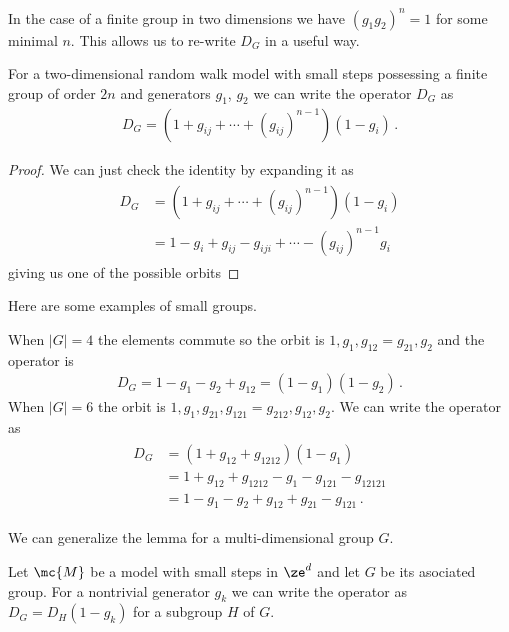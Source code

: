 In the case of a finite group in two dimensions we have $(g_1g_2)^n = 1$ for some minimal $n$. This allows us to re-write $D_G$ in a useful way.
\begin{lemma} For a two-dimensional random walk model with small steps possessing a finite group of order $2n$ and generators $g_1$, $g_2$ we can write the operator $D_G$ as
\begin{align}
	D_G = (1+g_{ij}+\cdots+(g_{ij})^{n-1})(1-g_i)\,.
\end{align}
\end{lemma}
\begin{proof} We can just check the identity by expanding it as
\begin{align}\begin{split}
	D_G &= (1+g_{ij}+\cdots+(g_{ij})^{n-1})(1-g_i)\\
	        &= 1- g_i +g_{ij}-g_{iji} + \cdots - (g_{ij})^{n-1}g_i
\end{split}\end{align}
giving us one of the possible orbits
\end{proof}
Here are some examples of small groups.
\begin{example} When $|G| = 4$ the elements commute so the orbit is $1, g_1,g_{12} = g_{21}, g_2$ and the operator is
\begin{align}
	D_G = 1 - g_1 - g_2 + g_{12} = (1-g_1)(1-g_2)\,.
\end{align}
When $|G| = 6$ the orbit is $1,g_1,g_{21},g_{121}=g_{212},g_{12},g_2$. We can write the operator as
\begin{align}\begin{split}
	D_G &= (1+g_{12}+g_{1212})(1-g_1) \\
	&=  1+g_{12}+g_{1212} - g_1 - g_{121} - g_{12121} \\
	&= 1 -g_1 - g_2 + g_{12}+g_{21}-g_{121}\,.
\end{split}\end{align}
\end{example}
We can generalize the lemma for a multi-dimensional group $G$.
\begin{lemma}Let $\mc{M}$ be a model with small steps in $\ze^d$ and let $G$ be its asociated group. For a nontrivial generator $g_k$ we can write the operator as $D_G = D_H(1-g_k)$ for a subgroup $H$ of $G$.
\end{lemma}
